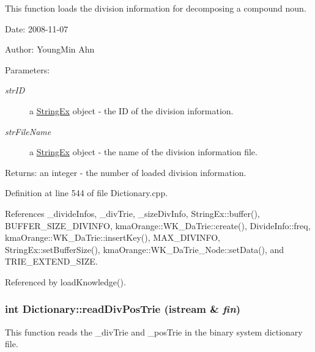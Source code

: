 This function loads the division information for decomposing a compound noun. 

\begin{Desc}
\item[Date:]2008-11-07 \end{Desc}
\begin{Desc}
\item[Author:]YoungMin Ahn \end{Desc}
\begin{Desc}
\item[Parameters:]
\begin{description}
\item[{\em strID}]a \hyperlink{classStringEx}{StringEx} object - the ID of the division information. \item[{\em strFileName}]a \hyperlink{classStringEx}{StringEx} object - the name of the division information file. \end{description}
\end{Desc}
\begin{Desc}
\item[Returns:]an integer - the number of loaded division information. \end{Desc}


Definition at line 544 of file Dictionary.cpp.

References \_\-divideInfos, \_\-divTrie, \_\-sizeDivInfo, StringEx::buffer(), BUFFER\_\-SIZE\_\-DIVINFO, kmaOrange::WK\_\-DaTrie::create(), DivideInfo::freq, kmaOrange::WK\_\-DaTrie::insertKey(), MAX\_\-DIVINFO, StringEx::setBufferSize(), kmaOrange::WK\_\-DaTrie\_\-Node::setData(), and TRIE\_\-EXTEND\_\-SIZE.

Referenced by loadKnowledge().\hypertarget{classkmaOrange_1_1Dictionary_61dd5200de96564edbc8c3506cec743e}{
\subsubsection[{readDivPosTrie}]{\setlength{\rightskip}{0pt plus 5cm}int Dictionary::readDivPosTrie (istream \& {\em fin})}}
\label{classkmaOrange_1_1Dictionary_61dd5200de96564edbc8c3506cec743e}


This function reads the \_\-divTrie and \_\-posTrie in the binary system dictionary file. 

